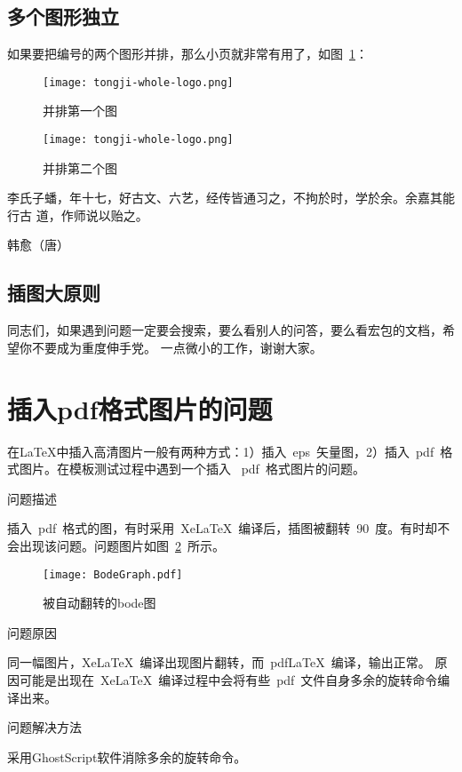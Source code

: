 \subsection{多个图形独立}
如果要把编号的两个图形并排，那么小页就非常有用了，如图~\ref{fig:parallel2}：
\begin{figure}
\begin{minipage}{0.48\textwidth}
  \centering
  \texttt{[image: tongji-whole-logo.png]}
  \caption{并排第一个图}
  \label{fig:parallel1}
\end{minipage}\hfill
\begin{minipage}{0.48\textwidth}
  \centering
  \texttt{[image: tongji-whole-logo.png]}
  \caption{并排第二个图}
  \label{fig:parallel2}
\end{minipage}
\end{figure}


李氏子蟠，年十七，好古文、六艺，经传皆通习之，不拘於时，学於余。余嘉其能行古
道，作师说以贻之。

\hfill \pozhehao 韩愈（唐）


\subsection{插图大原则}
同志们，如果遇到问题一定要会搜索，要么看别人的问答，要么看宏包的文档，希望你不要成为重度伸手党。
一点微小的工作，谢谢大家。

\section{插入pdf格式图片的问题}
\label{sec:problem}
在\LaTeX{}中插入高清图片一般有两种方式：1）插入~eps~矢量图，2）插入~pdf~格式图片。在模板测试过程中遇到一个插入
~pdf~格式图片的问题。

问题描述

插入~pdf~格式的图，有时采用~XeLaTeX~编译后，插图被翻转~90~度。有时却不会出现该问题。问题图片如图~\ref{rotatedBode}~所示。
\begin{figure}[H] 
  \centering
  \texttt{[image: BodeGraph.pdf]}
  \caption{被自动翻转的bode图}
  \label{rotatedBode}
\end{figure}

问题原因

同一幅图片，XeLaTeX~编译出现图片翻转，而~pdfLaTeX~编译，输出正常。
原因可能是出现在~XeLaTeX~编译过程中会将有些~pdf~文件自身多余的旋转命令编译出来。

问题解决方法

采用GhostScript软件消除多余的旋转命令。

